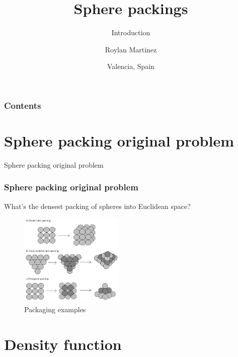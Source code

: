 \documentclass[10pt]{beamer}
\title[Universitat de Valencia]{Sphere packings}
\subtitle{Introduction}
\author[Análisis matemático y aplicaciones]{Roylan Martinez}
\institute[ ]{Universitat de València}
\date[February 23, 2023]
{Valencia, Spain}
\begin{document}
\frame{\titlepage}
\begin{frame}
\frametitle{Contents}
\tableofcontents
\end{frame}
\section{Sphere packing original problem}

\begin{frame}{Sphere packing original problem}
    \frametitle{Sphere packing original problem}
    
    
     What's the densest packing of spheres into Euclidean space?

    \begin{figure}[t]
    \includegraphics[width=5cm]{1.png}
    \centering
    \caption{Packaging examples \cite{arnold2000cannon}}
    \end{figure}
\end{frame}

\section{Density function}
\end{document}
